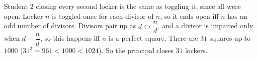 Student $2$ closing every second locker is the same as toggling it, since all were open. Locker $n$ is toggled once for each divisor of $n$, so it ends open iff $n$ has an odd number of divisors. Divisors pair up as $d\leftrightarrow\dfrac nd$, and a divisor is unpaired only when $d=\dfrac nd$, so this happens iff $n$ is a perfect square. There are $31$ squares up to $1000$ ($31^2=961<1000<1024$). So the principal closes $\boxed{31}$ lockers.
